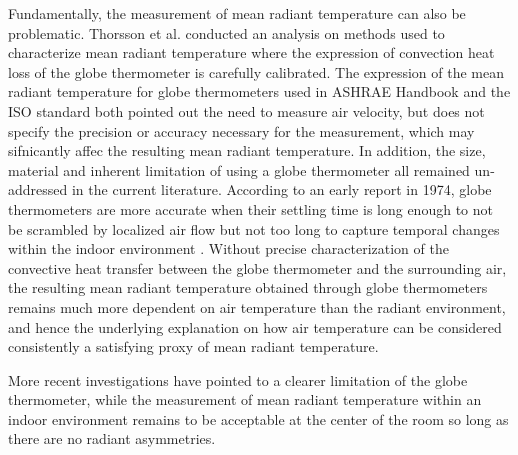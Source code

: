         Fundamentally, the measurement of mean radiant temperature can also be problematic. Thorsson et al. conducted an analysis on methods used to characterize mean radiant temperature where the expression of convection heat loss of the globe thermometer is carefully calibrated\cite{thorsson_different_2007}. The expression of the mean radiant temperature for globe thermometers used in ASHRAE Handbook \cite{american_society_of_heating_2013_2013} and the ISO standard both pointed out the need to measure air velocity, but does not specify the precision or accuracy necessary for the measurement, which may sifnicantly affec the resulting mean radiant temperature. In addition, the size, material and inherent limitation of using a globe thermometer all remained un-addressed in the current literature. According to an early report in 1974, globe thermometers are more accurate when their settling time is long enough to not be scrambled by localized air flow but not too long to capture temporal changes within the indoor environment \cite{graves_globe_1974}. Without precise characterization of the convective heat transfer between the globe thermometer and the surrounding air, the resulting mean radiant temperature obtained through globe thermometers remains much more dependent on air temperature than the radiant environment, and hence the underlying explanation on how air temperature can be considered consistently a satisfying proxy of mean radiant temperature. 


        More recent investigations have pointed to a clearer limitation of the globe thermometer, while the measurement of mean radiant temperature within an indoor environment remains to be acceptable at the center of the room \cite{dambrosio_alfano_measurement_2013} so long as there are no radiant asymmetries.
        


